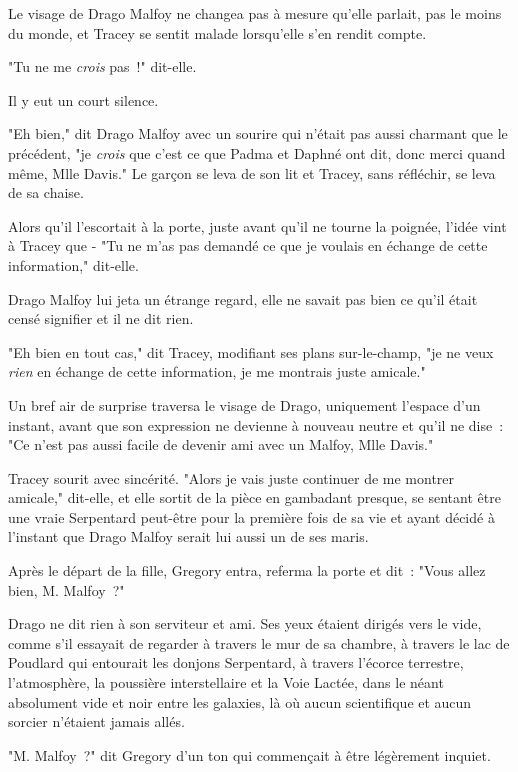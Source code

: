 Le visage de Drago Malfoy ne changea pas à mesure qu'elle parlait, pas le moins du monde, et Tracey se sentit malade lorsqu'elle s'en rendit compte.

"Tu ne me \emph{crois} pas~!" dit-elle.

Il y eut un court silence.

"Eh bien," dit Drago Malfoy avec un sourire qui n'était pas aussi charmant que le précédent, "je \emph{crois} que c'est ce que Padma et Daphné ont dit, donc merci quand même, Mlle Davis." Le garçon se leva de son lit et Tracey, sans réfléchir, se leva de sa chaise.

Alors qu'il l'escortait à la porte, juste avant qu'il ne tourne la poignée, l'idée vint à Tracey que - "Tu ne m'as pas demandé ce que je voulais en échange de cette information," dit-elle.

Drago Malfoy lui jeta un étrange regard, elle ne savait pas bien ce qu'il était censé signifier et il ne dit rien.

"Eh bien en tout cas," dit Tracey, modifiant ses plans sur-le-champ, "je ne veux \emph{rien} en échange de cette information, je me montrais juste amicale."

Un bref air de surprise traversa le visage de Drago, uniquement l'espace d'un instant, avant que son expression ne devienne à nouveau neutre et qu'il ne dise~: "Ce n'est pas aussi facile de devenir ami avec un Malfoy, Mlle Davis."

Tracey sourit avec sincérité. "Alors je vais juste continuer de me montrer amicale," dit-elle, et elle sortit de la pièce en gambadant presque, se sentant être une vraie Serpentard peut-être pour la première fois de sa vie et ayant décidé à l'instant que Drago Malfoy serait lui aussi un de ses maris.

\later

Après le départ de la fille, Gregory entra, referma la porte et dit~: "Vous allez bien, M. Malfoy~?"

Drago ne dit rien à son serviteur et ami. Ses yeux étaient dirigés vers le vide, comme s'il essayait de regarder à travers le mur de sa chambre, à travers le lac de Poudlard qui entourait les donjons Serpentard, à travers l'écorce terrestre, l'atmosphère, la poussière interstellaire et la Voie Lactée, dans le néant absolument vide et noir entre les galaxies, là où aucun scientifique et aucun sorcier n'étaient jamais allés.

"M. Malfoy~?" dit Gregory d'un ton qui commençait à être légèrement inquiet.

